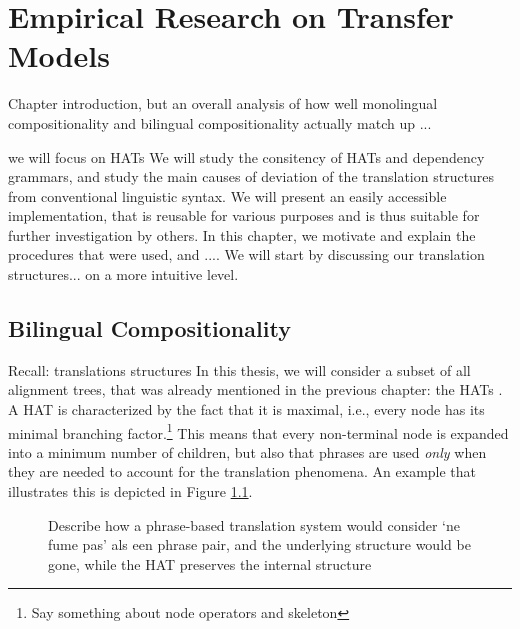 \documentclass{report}
\begin{document}
\chapter{Empirical Research on Transfer Models}

Chapter introduction, but an overall analysis of how well monolingual compositionality and bilingual compositionality actually match up ... 

we will focus on HATs
We will study the consitency of HATs and dependency grammars, and study the main causes of deviation of the translation structures from conventional linguistic syntax. We will present an easily accessible implementation, that is reusable for various purposes and is thus suitable for further investigation by others. In this chapter, we motivate and explain the procedures that were used, and .... We will start by discussing our translation structures... on a more intuitive level.

\section{Bilingual Compositionality}

Recall: translations structures
In this thesis, we will consider a subset of all alignment trees, that was already mentioned in the previous chapter: the HATs \citep{simaan2013hats}. A HAT is characterized by the fact that it is maximal, i.e., every node has its minimal branching factor.\footnote{Say something about node operators and skeleton} This means that every non-terminal node is expanded into a minimum number of children, but also that phrases are used \textit{only} when they are needed to account for the translation phenomena. An example that illustrates this is depicted in Figure \ref{fig:treephrase}.

\begin{figure}
\centering
{}
\caption{Describe how a phrase-based translation system would consider `ne fume pas' als een phrase pair, and the underlying structure would be gone, while the HAT preserves the internal structure}\label{fig:treephrase}
\end{figure}
\end{document}
